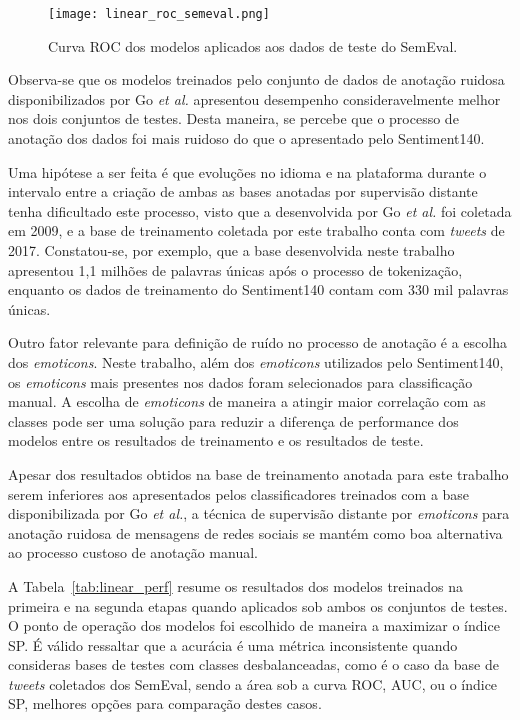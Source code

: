 \begin{figure}
\begin{center} {
    \begin{center}
    \texttt{[image: linear\_roc\_semeval.png]}
    \caption{Curva ROC dos modelos aplicados aos dados de teste do SemEval.}
    \label{fig:linear_roc_semeval}
    \end{center}
}
\end{center}
\end{figure}

Observa-se que os modelos treinados pelo conjunto de dados de anotação ruidosa disponibilizados por Go
\textit{et al.} apresentou desempenho consideravelmente melhor nos dois conjuntos de testes.
Desta maneira, se percebe que o processo de anotação dos dados foi mais ruidoso do que o apresentado pelo Sentiment140.

Uma hipótese a ser feita é que evoluções no idioma e na plataforma durante o intervalo entre a criação de ambas as
bases anotadas por supervisão distante tenha dificultado este processo, visto que a desenvolvida por Go \textit{et al.}
foi coletada em 2009, e a base de treinamento coletada por este trabalho conta com \textit{tweets} de 2017.
Constatou-se, por exemplo, que a base desenvolvida neste trabalho apresentou 1,1 milhões de palavras únicas após o
processo de tokenização, enquanto os dados de treinamento do Sentiment140 contam com 330 mil palavras únicas.

Outro fator relevante para definição de ruído no processo de anotação é a escolha dos \textit{emoticons}.
Neste trabalho, além dos \textit{emoticons} utilizados pelo Sentiment140, os \textit{emoticons} mais presentes nos dados
foram selecionados para classificação manual.
A escolha de \textit{emoticons} de maneira a atingir maior correlação com as classes pode ser uma solução para reduzir
a diferença de performance dos modelos entre os resultados de treinamento e os resultados de teste.

Apesar dos resultados obtidos na base de treinamento anotada para este trabalho serem inferiores aos apresentados pelos
classificadores treinados com a base disponibilizada por Go \textit{et al.}, a técnica de supervisão distante por
\textit{emoticons} para anotação ruidosa de mensagens de redes sociais se mantém como boa alternativa ao processo
custoso de anotação manual.

A Tabela~\ref{tab:linear_perf} resume os resultados dos modelos treinados na primeira e na segunda etapas quando
aplicados sob ambos os conjuntos de testes.
O ponto de operação dos modelos foi escolhido de maneira a maximizar o índice SP.
É válido ressaltar que a acurácia é uma métrica inconsistente quando consideras bases de testes com classes
desbalanceadas, como é o caso da base de \textit{tweets} coletados dos SemEval, sendo a área sob a curva ROC, AUC, ou o
índice SP, melhores opções para comparação destes casos.

